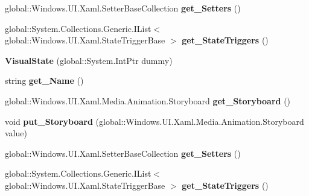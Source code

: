 \begin{DoxyCompactItemize}
\item 
\mbox{\label{class_windows_1_1_u_i_1_1_xaml_1_1_visual_state_ac81aee782cc1e2a4470e9847716cafa0}} 
global\+::\+Windows.\+U\+I.\+Xaml.\+Setter\+Base\+Collection {\bfseries get\+\_\+\+Setters} ()
\item 
\mbox{\label{class_windows_1_1_u_i_1_1_xaml_1_1_visual_state_a27eb2311db04fa8c2a18edac2aa49be9}} 
global\+::\+System.\+Collections.\+Generic.\+I\+List$<$ global\+::\+Windows.\+U\+I.\+Xaml.\+State\+Trigger\+Base $>$ {\bfseries get\+\_\+\+State\+Triggers} ()
\item 
\mbox{\label{class_windows_1_1_u_i_1_1_xaml_1_1_visual_state_a2c46a539387b55802a381e56d280a8ae}} 
{\bfseries Visual\+State} (global\+::\+System.\+Int\+Ptr dummy)
\item 
\mbox{\label{class_windows_1_1_u_i_1_1_xaml_1_1_visual_state_a879a468f5014b12ff6c4d57ff0f58a5b}} 
string {\bfseries get\+\_\+\+Name} ()
\item 
\mbox{\label{class_windows_1_1_u_i_1_1_xaml_1_1_visual_state_a6b5d43fae9eab67c703b75086a08b538}} 
global\+::\+Windows.\+U\+I.\+Xaml.\+Media.\+Animation.\+Storyboard {\bfseries get\+\_\+\+Storyboard} ()
\item 
\mbox{\label{class_windows_1_1_u_i_1_1_xaml_1_1_visual_state_a3b834606f339f18853900acbdc0871b8}} 
void {\bfseries put\+\_\+\+Storyboard} (global\+::\+Windows.\+U\+I.\+Xaml.\+Media.\+Animation.\+Storyboard value)
\item 
\mbox{\label{class_windows_1_1_u_i_1_1_xaml_1_1_visual_state_ac81aee782cc1e2a4470e9847716cafa0}} 
global\+::\+Windows.\+U\+I.\+Xaml.\+Setter\+Base\+Collection {\bfseries get\+\_\+\+Setters} ()
\item 
\mbox{\label{class_windows_1_1_u_i_1_1_xaml_1_1_visual_state_a27eb2311db04fa8c2a18edac2aa49be9}} 
global\+::\+System.\+Collections.\+Generic.\+I\+List$<$ global\+::\+Windows.\+U\+I.\+Xaml.\+State\+Trigger\+Base $>$ {\bfseries get\+\_\+\+State\+Triggers} ()

\end{DoxyCompactItemize}
